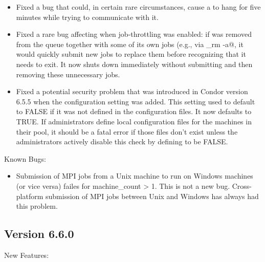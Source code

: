 \begin{itemize}
\item Fixed a  bug that could, in certain rare
      circumstances, cause a  to hang for five minutes
      while trying to communicate with it.

\item Fixed a rare bug affecting  when job-throttling
      was enabled: if  was removed from the queue
      together with some of its own jobs (e.g., via \verb@condor_rm -a@,
      it would quickly submit new jobs to replace them before
      recognizing that it needs to exit.  It now shuts down
      immediately without submitting and then removing these
      unnecessary jobs.

\item Fixed a potential security problem that was introduced in Condor
  version 6.5.5 when the 
  configuration setting was added.
  This setting used to default to FALSE if it was not defined in the
  configuration files.
  It now defaults to TRUE.
  If administrators define local configuration files for the machines
  in their pool, it should be a fatal error if those files don't exist
  unless the administrators actively disable this check by defining 
   to be FALSE.

\end{itemize}

\noindent Known Bugs:

\begin{itemize}

\item Submission of MPI jobs from a Unix machine to run on Windows
machines (or vice versa) failes for machine\_count > 1.  This is
not a new bug.  Cross-platform submission of MPI jobs between
Unix and Windows has always had this problem.

\end{itemize}


\subsection{\label{sec:New-6-6-0}Version 6.6.0}

\noindent New Features:

